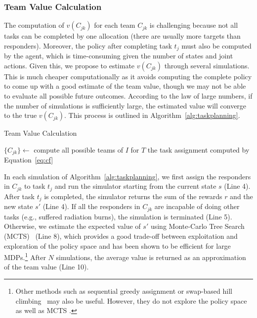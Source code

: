 \subsubsection{Team Value Calculation}
\noindent The computation of $v(C_{jk})$ for each team $C_{jk}$ is
challenging because not all tasks can be completed by one allocation
(there are usually more targets than responders). Moreover, the policy
after completing task $t_j$ must also be computed by the agent, which
is time-consuming given the number of states and joint actions. Given
this, we propose to estimate $v(C_{jk})$ through several
simulations. This is much cheaper computationally as it avoids
computing the complete policy to come up with a good estimate of the
team value, though we may not be able to evaluate all possible future
outcomes. According to the law of large numbers, if the number of
simulations is sufficiently large, the estimated value will converge
to the true $v(C_{jk})$.  This process is outlined in
Algorithm~\ref{alg:taskplanning}.
\begin{algorithm}[htbp]
  \caption{Team Value Calculation}
  \label{alg:taskplanning}
  \Indm
  \Indp\BlankLine
  $\{ C_{jk} \} \gets$ compute all possible teams of $I$ for
  $T$ \;
  \Return the task assignment computed by Equation~\ref{eq:cf}
\end{algorithm}

In each simulation of Algorithm~\ref{alg:taskplanning}, we first
assign the responders in $C_{jk}$ to task $t_j$ and run the
simulator starting from the current state $s$ (Line 4). After task
$t_j$ is completed, the simulator returns the sum of the rewards
$r$ and the new state $s'$ (Line 4). If all the responders in
$C_{jk}$ are incapable of doing other tasks (e.g., suffered
radiation burns), the simulation is terminated (Line
5). Otherwise, we estimate the expected value of $s'$ using
Monte-Carlo Tree Search (MCTS)~\cite{kocsis2006bandit} (Line 8),
which provides a good trade-off between exploitation and exploration
of the policy space and has been shown to be efficient for large
MDPs.\footnote{Other methods such as sequential greedy assignment
or swap-based hill climbing~\cite{proper2009solving} may also be useful. However, they do not explore the policy space as well as MCTS \cite{kocsis2006bandit}.} After $N$ simulations, the average value is returned as an approximation of
the team value (Line 10).

